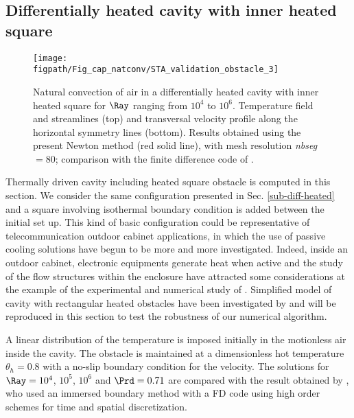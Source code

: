 \subsection{Differentially heated cavity with inner heated square} \label{sub-2D-OBSTACLE}

\begin{figure}
	\begin{center}
		\texttt{[image: \\figpath/Fig\_cap\_natconv/STA\_validation\_obstacle\_3]} 
	\end{center}
	\caption{Natural convection of air in a differentially heated cavity with inner heated square for $\Ray$ ranging from $10^4$ to $10^6$. Temperature field and streamlines (top) and transversal velocity profile along the  horizontal symmetry lines (bottom). Results obtained using the present Newton method (red solid line), with mesh resolution {\em nbseg} $=80$; comparison with the finite difference code of \cite{Raluca2013}.}
	\label{fig-obst-2D}
\end{figure}

Thermally driven cavity including heated square obstacle is computed in this section.
We consider the same configuration presented in Sec. \ref{sub-diff-heated} and a square involving isothermal boundary condition is added between the initial set up.
This kind of basic configuration could be representative of telecommunication outdoor cabinet applications, in which the use of passive cooling solutions have begun to be more and more investigated.
Indeed, inside an outdoor cabinet, electronic equipments generate heat when active and the study of the flow structures within the enclosure have attracted some considerations at the example of the experimental and numerical study of \cite{Raluca2013}.
Simplified model of cavity with rectangular heated obstacles have been investigated by \cite{Raluca2013} and will be reproduced in this section to test the robustness of our numerical algorithm.

A linear distribution of the temperature is imposed initially in the motionless air inside the cavity.
The obstacle is maintained at a dimensionless hot temperature $\theta_h = 0.8$ with a no-slip boundary condition for the velocity.
The solutions for $\Ray= 10^4$, $10^5$, $10^6$ and $\Prd = 0.71$ are compared with the result obtained by \cite{Raluca2013}, who used an immersed boundary method with a FD code using high order schemes for time and spatial discretization.

